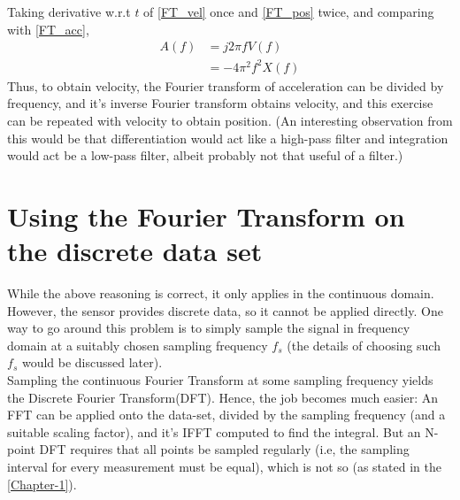 \documentclass[oneside]{book}
\begin{document}
Taking derivative w.r.t $t$ of \eqref{FT_vel} once and \eqref{FT_pos} twice, and comparing with \eqref{FT_acc},
\begin{align}
    A(f) &= j2 \pi f  V(f)\\
    &= -4 \pi^2 f^2  X(f)
\end{align}
Thus, to obtain velocity, the Fourier transform of acceleration can be divided by frequency, and it's inverse Fourier transform obtains velocity, and this exercise can be repeated with velocity to obtain position. (An interesting observation from this would be that differentiation would act like a high-pass filter and integration would act be a low-pass filter, albeit probably not that useful of a filter.)\\
\newpage
\chapter{Using the Fourier Transform on the discrete data set}
While the above reasoning is correct, it only applies in the continuous domain. However, the sensor provides discrete data, so it cannot be applied directly. One way to go around this problem is to simply sample the signal in frequency domain at a suitably chosen sampling frequency $f_s$ (the details of choosing such $f_s$ would be discussed later). \\
Sampling the continuous Fourier Transform at some sampling frequency yields the Discrete Fourier Transform(DFT). Hence, the job becomes much easier: An FFT can be applied onto the data-set, divided by the sampling frequency (and a suitable scaling factor), and it's IFFT computed to find the integral. But an N-point DFT requires that all points be sampled regularly (i.e, the sampling interval for every measurement must be equal), which is not so (as stated in the \autoref{Chapter-1}).
\end{document}
